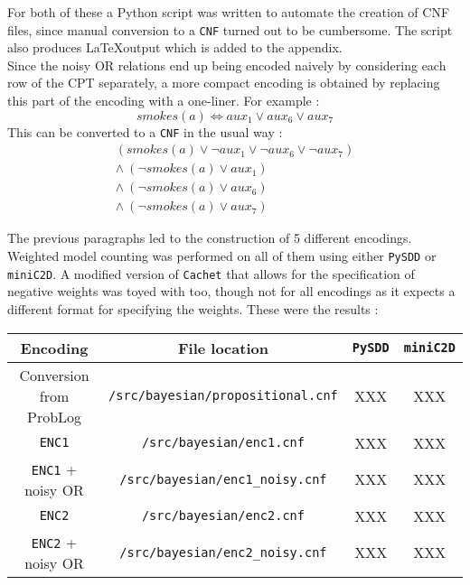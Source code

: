 \begin{multicols*}{2}
\noindent For both of these a Python script was written to automate the creation of CNF files, since manual conversion to a \texttt{CNF} turned out to be cumbersome. The script also produces \LaTeX output which is added to the appendix.\\

\noindent Since the noisy OR relations end up being encoded naively by considering each row of the CPT separately, a more compact encoding is obtained by replacing this part of the encoding with a one-liner. For example :
$$smokes(a)\Leftrightarrow aux_1 \lor aux_6 \lor aux_7$$
\noindent This can be converted to a \texttt{CNF} in the usual way :
\begin{gather*}
(smokes(a) \lor \lnot aux_1\lor\lnot aux_6\lor\lnot aux_7)\\
\land\ (\lnot smokes(a) \lor aux_1)\\
\land\ (\lnot smokes(a) \lor aux_6)\\
\land\ (\lnot smokes(a) \lor aux_7)
\end{gather*}

\end{multicols*}



The previous paragraphs led to the construction of 5 different encodings. Weighted model counting was performed on all of them using either \texttt{PySDD} or \texttt{miniC2D}. A modified version of \texttt{Cachet} that allows for the specification of negative weights was toyed with too, though not for all encodings as it expects a different format for specifying the weights. These were the results :
\begin{center}
\begin{tabular}{cc|cc}
Encoding & File location & \texttt{PySDD} & \texttt{miniC2D} \\\hline
Conversion from ProbLog & \texttt{/src/bayesian/propositional.cnf} & XXX & XXX\\
\texttt{ENC1} & \texttt{/src/bayesian/enc1.cnf} & XXX & XXX\\
\texttt{ENC1} + noisy OR & \texttt{/src/bayesian/enc1\_noisy.cnf} & XXX & XXX\\
\texttt{ENC2} & \texttt{/src/bayesian/enc2.cnf} & XXX & XXX\\
\texttt{ENC2} + noisy OR & \texttt{/src/bayesian/enc2\_noisy.cnf} & XXX & XXX\\
\end{tabular}
\end{center}

